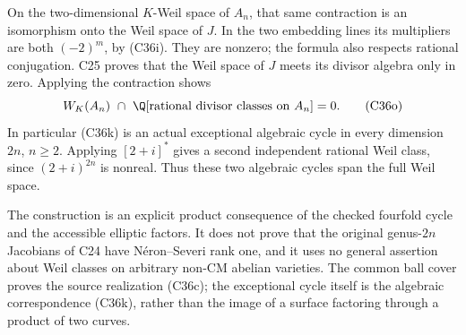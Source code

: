 On the two-dimensional $K$-Weil space of $A_n$, that
same contraction is an isomorphism onto the Weil space
of $J$. In the two embedding lines its multipliers
are both $(-2)^m$, by (C36i). They are nonzero; the
formula also respects rational conjugation.
C25 proves that the Weil space of $J$ meets its divisor
algebra only in zero. Applying the contraction shows
\[
 W_K(A_n)\ \cap\
       \Q[\hbox{rational divisor classes on }A_n]=0.
 \tag{C36o}
\]
In particular (C36k) is an actual exceptional algebraic
cycle in every dimension $2n$, $n\ge2$.
Applying $[2+i]^*$ gives a second independent rational
Weil class, since $(2+i)^{2n}$ is nonreal. Thus these
two algebraic cycles span the full Weil space.

The construction is an explicit product consequence of
the checked fourfold cycle and the accessible elliptic
factors. It does not prove that the original genus-$2n$
Jacobians of C24 have N\'eron--Severi rank one, and it
uses no general assertion about Weil classes on arbitrary
non-CM abelian varieties. The common ball cover proves
the source realization (C36c); the exceptional cycle
itself is the algebraic correspondence (C36k), rather
than the image of a surface factoring through a product
of two curves.
